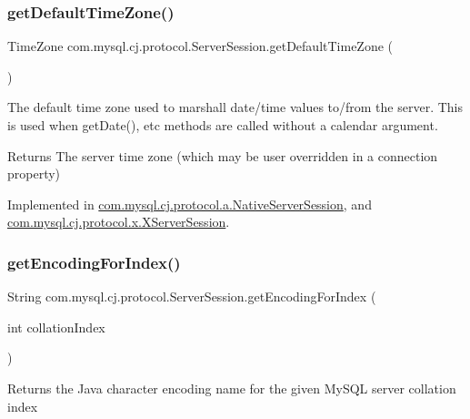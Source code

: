 \subsubsection{\texorpdfstring{get\+Default\+Time\+Zone()}{getDefaultTimeZone()}}
{\footnotesize\ttfamily Time\+Zone com.\+mysql.\+cj.\+protocol.\+Server\+Session.\+get\+Default\+Time\+Zone (\begin{DoxyParamCaption}{ }\end{DoxyParamCaption})}

The default time zone used to marshall date/time values to/from the server. This is used when get\+Date(), etc methods are called without a calendar argument.

\begin{DoxyReturn}{Returns}
The server time zone (which may be user overridden in a connection property) 
\end{DoxyReturn}


Implemented in \mbox{\hyperlink{classcom_1_1mysql_1_1cj_1_1protocol_1_1a_1_1_native_server_session_abba6aad0abd51609f134af9fa2cd345f}{com.\+mysql.\+cj.\+protocol.\+a.\+Native\+Server\+Session}}, and \mbox{\hyperlink{classcom_1_1mysql_1_1cj_1_1protocol_1_1x_1_1_x_server_session_aacde6eddcc1fd40cc726095f2f2d6b44}{com.\+mysql.\+cj.\+protocol.\+x.\+X\+Server\+Session}}.

\mbox{\label{interfacecom_1_1mysql_1_1cj_1_1protocol_1_1_server_session_a437ab4e5fb2cdd6cc66f206bce8688cd}} 
\subsubsection{\texorpdfstring{get\+Encoding\+For\+Index()}{getEncodingForIndex()}}
{\footnotesize\ttfamily String com.\+mysql.\+cj.\+protocol.\+Server\+Session.\+get\+Encoding\+For\+Index (\begin{DoxyParamCaption}\item[{int}]{collation\+Index }\end{DoxyParamCaption})}

Returns the Java character encoding name for the given My\+S\+QL server collation index


